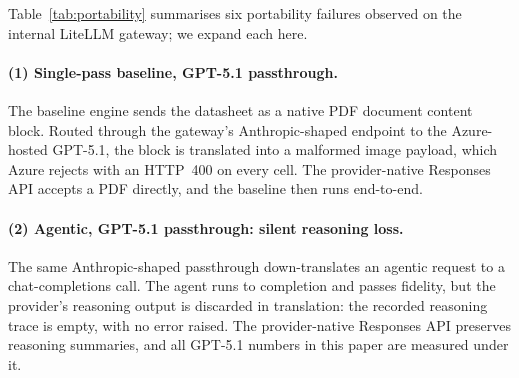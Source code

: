 \documentclass[11pt]{article}
\begin{document}
Table~\ref{tab:portability} summarises six portability failures observed
on the internal LiteLLM gateway; we expand each here.

\begin{table}[t]
\centering
\small
{}
\caption{Six cross-provider portability failures surfaced on one
inference gateway. Two are \emph{silent} (guided-decoding tool masking
and dropped reasoning) and are the ones fidelity-only scoring would
miss. The two GPT-5.1 rows are artefacts of the Anthropic-shaped
passthrough and are resolved by the provider-native Responses API
(Section~\ref{sec:setup}); the rest are backend limitations.}
\label{tab:portability}
\end{table}

\paragraph{(1) Single-pass baseline, GPT-5.1 passthrough.}
The baseline engine sends the datasheet as a native PDF document content
block. Routed through the gateway's Anthropic-shaped endpoint to the
Azure-hosted GPT-5.1, the block is translated into a malformed image
payload, which Azure rejects with an HTTP~400 on every cell. The
provider-native Responses API accepts a PDF directly, and the baseline
then runs end-to-end.

\paragraph{(2) Agentic, GPT-5.1 passthrough: silent reasoning loss.}
The same Anthropic-shaped passthrough down-translates an agentic request
to a chat-completions call. The agent runs to completion and passes
fidelity, but the provider's reasoning output is discarded in
translation: the recorded reasoning trace is empty, with no error
raised. The provider-native Responses API preserves
reasoning summaries, and all GPT-5.1 numbers in this paper are measured
under it.
\end{document}
